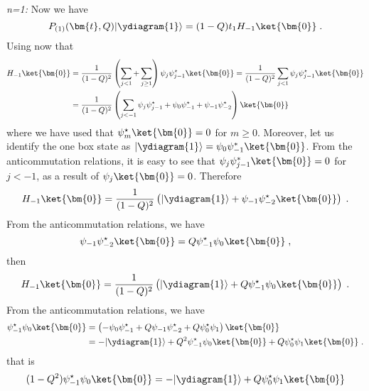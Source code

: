 \emph{n=1:} Now we have 
\begin{equation}
    P_{(1)}(\bm{t}, Q) |\ydiagram{1} \rangle = (1 - Q)t_{1}H_{-1} \ket{\bm{0}} \; .
\end{equation}
Using now that 
\begin{equation}
  \begin{split}
  H_{-1} \ket{\bm{0}} & = \frac{1}{(1-Q)^2} \left(\sum_{j < 1} +
  \sum_{j \geq 1} \right) \psi_j\psi^\star_{j-1} \ket{\bm{0}} =
  \frac{1}{(1-Q)^2} \sum_{j < 1} \psi_j\psi^\star_{j-1} \ket{\bm{0}}
  \\ & = \frac{1}{(1-Q)^2} \left ( \sum_{j < -1}
  \psi_j\psi^\star_{j-1} + \psi_0\psi^\star_{-1} +
  \psi_{-1}\psi^\star_{-2}\right)\ket{\bm{0}}
  \end{split}
\end{equation}
where we have used that \(\psi_m^\star \ket{\bm{0}} = 0 \) for \(m\geq
0\). Moreover, let us identify the one box state as \(|\ydiagram{1}
\rangle = \psi_0 \psi_{-1}^\ast \ket{\bm{0}}\).  From the
anticommutation relations, it is easy to see that \(\psi_j
\psi_{j-1}^\ast \ket{\bm{0}} = 0\) for \(j < -1\), as a result of
\(\psi_j\ket{\bm{0}} = 0\). Therefore
\begin{equation}
  H_{-1} \ket{\bm{0}} = \frac{1}{(1-Q)^2} \left(|\ydiagram{1}\rangle
  + \psi_{-1}\psi^\star_{-2}\ket{\bm{0}} \right)\; .
\end{equation}
From the anticommutation relations, we have
\begin{equation}
  \psi_{-1}\psi^\star_{-2}\ket{\bm{0}} = Q\psi_{-1}^\star\psi_{0}\ket{\bm{0}}\; ,
\end{equation}
then
\begin{equation}
  H_{-1} \ket{\bm{0}} = \frac{1}{(1-Q)^2} \left(|\ydiagram{1}\rangle
  + Q \psi_{-1}^\star\psi_{0}\ket{\bm{0}} \right)\; .
\end{equation}
From the anticommutation relations, we have
\begin{equation}
  \begin{split}
    \psi_{-1}^\star\psi_{0}\ket{\bm{0}} & = \left( - \psi_0
    \psi_{-1}^\star + Q \psi_{-1} \psi_{-2}^\star + Q \psi_0^\star
    \psi_1 \right) \ket{\bm{0}} \\ & = - |\ydiagram{1}\rangle +
    Q^2\psi_{-1}^\star\psi_{0}\ket{\bm{0}} + Q \psi_0^\star \psi_1
    \ket{\bm{0}} \; .
  \end{split}
\end{equation}
that is
\begin{equation}
 (1 - Q^2)\psi_{-1}^\star\psi_{0}\ket{\bm{0}} = - |\ydiagram{1}\rangle
  + Q \psi_0^\star \psi_1 \ket{\bm{0}}
\end{equation}

